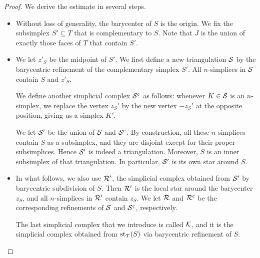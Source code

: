 \documentclass[10pt,letterpaper]{article}
\begin{document}
\begin{proof}
    We derive the estimate in several steps. 
    \begin{itemize}
        \item 
        Without loss of generality, the barycenter of $S$ is the origin. 
        We fix the subsimplex $S' \subseteq T$ that is complementary to $S$.
        Note that $J$ is the union of exactly those faces of $T$ that contain $S'$.
        
        
        \item 
        We let $z'_{S}$ be the midpoint of $S'$. 
        We first define a new triangulation ${\mathcal S}$ by the barycentric refinement of the complementary simplex $S'$. 
        All $n$-simplices in ${\mathcal S}$ contain $S$ and $z'_{S}$.
        
        We define another simplicial complex ${\mathcal S}^c$ as follows:
        whenever $K \in {\mathcal S}$ is an $n$-simplex, 
        we replace the vertex $z_{S}'$ by the new vertex $-z_{S}'$ at the opposite position,
        giving us a simplex $K'$. 
        
        We let ${\mathcal S}'$ be the union of ${\mathcal S}$ and ${\mathcal S}^c$. 
        By construction, all these $n$-simplices contain $S$ as a subsimplex,
        and they are disjoint except for their proper subsimplices. 
        Hence ${\mathcal S}'$ is indeed a triangulation. 
        Moreover, $S$ is an inner subsimplex of that triangulation. 
        In particular, ${\mathcal S}'$ is its own star around $S$.
        
        
        \item 
        In what follows, we also use ${\mathcal R}'$, 
        the simplicial complex obtained from ${\mathcal S}'$ by barycentric subdivision of $S$.
        Then ${\mathcal R}'$ is the local star around the barycenter $z_S$,
        and all $n$-simplices in ${\mathcal R}'$ contain $z_{S}$. 
        We let ${\mathcal R}$ and ${\mathcal R}^{c}$ be the corresponding refinements of ${\mathcal S}$ and ${\mathcal S}^{c}$, respectively.
        
        The last simplicial complex that we introduce is called ${\mathcal K}$,
        and it is the simplicial complex obtained from $\operatorname{st}_{{\mathcal T}}(S)$ via barycentric refinement of $S$. 
        

\end{itemize}
\end{proof}
\end{document}

